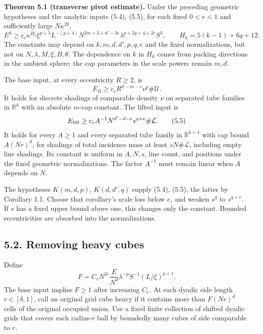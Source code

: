 \documentclass[
  11pt,
  a4paper,
]{article}
\begin{document}
\textbf{Theorem 5.1 (transverse pivot estimate).} Under the preceding
geometric hypotheses and the analytic inputs (5.4), (5.5), for each
fixed \(0<e<1\) and sufficiently large \(N\kappa^{20}\), \[
 \boxed{
 E^4\ge c_e\kappa^{H_k}\xi^{p+3}L^{-(p+4)}
 N^{2m+3+d'-3e}\lambda^{p+2q+4+2e}S^3,
 \qquad H_k=5(k-1)+6q+12.}                       \tag{5.3}\label{eq:5.3}
\] The constants may depend on \(k,m,d,d',p,q,e\) and the fixed
normalizations, but not on \(N,\lambda,M,\xi,B,\theta\). The dependence
on \(k\) in \(H_k\) comes from packing directions in the ambient sphere;
the cap parameters in the scale powers remain \(m,d\).

The base input, at every eccentricity \(R\ge2\), is \[
 E_R\ge c_e R^{d-m-e}\nu^p\#\mathcal U.             \tag{5.4}\label{eq:5.4}
\] It holds for discrete shadings of comparable density \(\nu\) on
separated tube families in \(\mathbb R^k\) with an absolute \(m\)-cap
constant. The lifted input is \[
 E_{\rm lift}\ge c_e A^{-1}N^{d'-d-e}
 s^{q+e}\#\mathcal L.                              \tag{5.5}\label{eq:5.5}
\] It holds for every \(A\ge1\) and every separated tube family in
\(\mathbb R^{k+1}\) with cap bound \(A(Nr)^d\), for shadings of total
incidence mass at least \(sN\#\mathcal L\), including empty line
shadings. Its constant is uniform in \(A,N,s\), line count, and
positions under the fixed geometric normalizations. The factor
\(A^{-1}\) must remain linear when \(A\) depends on \(N\).

The hypotheses \(K(m,d,p)\), \(K(d,d',q)\) supply (5.4), (5.5), the
latter by Corollary 1.1. Choose that corollary's scale loss below \(e\),
and weaken \(s^q\) to \(s^{q+e}\). If \(s\) has a fixed upper bound
above one, this changes only the constant. Bounded eccentricities are
absorbed into the normalizations.

\hypertarget{removing-heavy-cubes}{%
\subsection{5.2. Removing heavy cubes}\label{removing-heavy-cubes}}

Define \[
 F=C_eN^{2e}\frac{E}{N^d}\lambda^{-p}S^{-1}
       (L/\xi)^{p+1}.                            \tag{5.6}\label{eq:5.6}
\] The base input implies \(F\ge1\) after increasing \(C_e\). At each
dyadic side length \(r\in[\delta,1]\), call an original grid cube heavy
if it contains more than \(F(Nr)^d\) cells of the original occupied
union. Use a fixed finite collection of shifted dyadic grids that covers
each radius-\(r\) ball by boundedly many cubes of side comparable to
\(r\).
\end{document}
